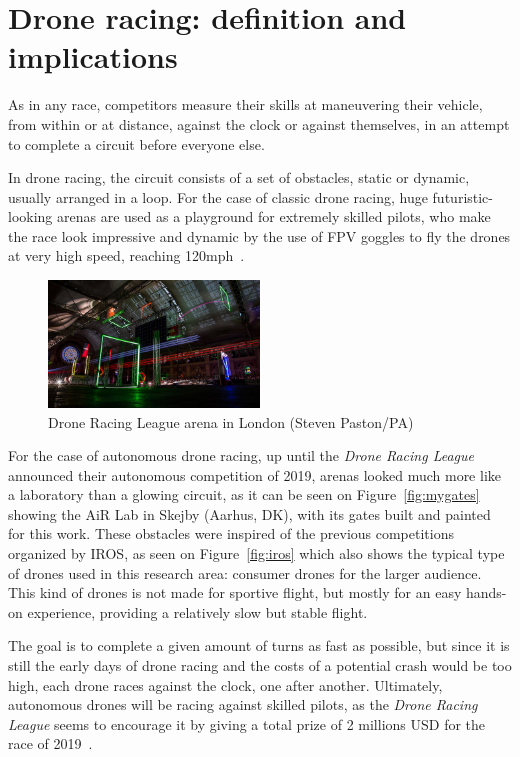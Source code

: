 \section{Drone racing: definition and implications}

As in any race, competitors measure their skills at maneuvering their vehicle,
from within or at distance, against the clock or against themselves, in an
attempt to complete a circuit before everyone else.

In drone racing, the circuit consists of a set of obstacles, static or
dynamic, usually arranged in a loop. For the case of classic drone racing, huge
futuristic-looking arenas are used as a playground for extremely skilled pilots,
who make the race look impressive and dynamic by the use of FPV goggles to fly
the drones at very high speed, reaching 120mph~\cite{DRL}.

\begin{figure}[h]
	\centering
	\includegraphics[width=0.5\textwidth]{figure/drl_arena.jpg}
	\caption{Drone Racing League arena in London (Steven
	Paston/PA)~\cite{DRLRecord}}
\end{figure}

For the case of autonomous drone racing, up until the \emph{Drone Racing
League} announced their autonomous competition of 2019, arenas looked much more
like a laboratory than a glowing circuit, as it can be seen on
Figure~\ref{fig:mygates} showing the AiR Lab in Skejby (Aarhus, DK), with its
gates built and painted for this work. These obstacles were inspired of the
previous competitions organized by IROS, as seen on Figure~\ref{fig:iros} which
also shows the typical type of drones used in this research area: consumer
drones for the larger audience. This kind of drones is not made for sportive
flight, but mostly for an easy hands-on experience, providing a relatively slow
but stable flight.

The goal is to complete a given amount of turns as fast as possible, but since
it is still the early days of drone racing and the costs of a potential crash
would be too high, each drone races against the clock, one after another.
Ultimately, autonomous drones will be racing against skilled pilots, as the
\emph{Drone Racing League} seems to encourage it by giving a total prize of 2
millions USD for the race of 2019~\cite{LockheedDRL}.


